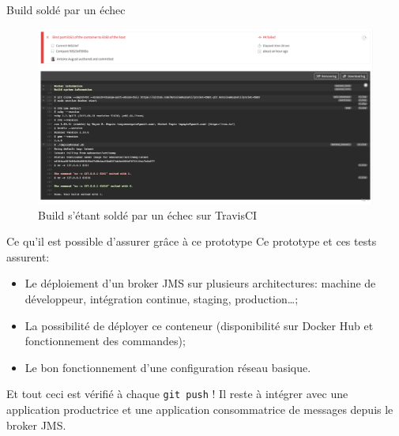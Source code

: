 \begin{frame}{Build soldé par un échec}
    \begin{figure}[H]
        \centering
        \includegraphics[width=\textwidth]{images/travis-build-failure.png}
        \caption{Build s'étant soldé par un échec sur TravisCI}
    \end{figure}
\end{frame}

\begin{frame}{Ce qu'il est possible d'assurer grâce à ce prototype}
    Ce prototype et ces tests assurent:
    \begin{itemize}
        \item Le déploiement d'un broker JMS sur plusieurs architectures: machine de développeur, intégration continue, staging, production\dots;
        \item La possibilité de déployer ce conteneur (disponibilité sur Docker Hub et fonctionnement des commandes);
        \item Le bon fonctionnement d'une configuration réseau basique.
    \end{itemize}\bigskip
    Et tout ceci est vérifié à chaque \texttt{git push} ! Il reste à intégrer avec une application productrice et une application consommatrice de messages depuis le broker JMS.
\end{frame}
